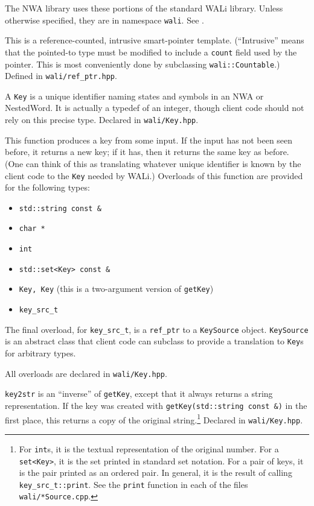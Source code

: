 The NWA library uses these portions of the standard WALi library. Unless
otherwise specified, they are in namespace \texttt{wali}. See \cite{wali}.

\begin{functionlist}
   This is a reference-counted, intrusive
    smart-pointer template. (``Intrusive'' means that the pointed-to type
    must be modified to include a \texttt{count} field used by the
    pointer. This is most conveniently done by subclassing
    \texttt{wali::Countable}.) Defined in \texttt{wali/ref\_ptr.hpp}.

   A \texttt{Key} is a unique identifier naming states and symbols in an
    NWA or NestedWord. It is actually a typedef of an integer, though client
    code should not rely on this precise type. Declared in
    \texttt{wali/Key.hpp}.

   This function produces a key from some input. If
    the input has not been seen before, it returns a new key; if it has, then
    it returns the same key as before. (One can think of this as translating
    whatever unique identifier is known by the client code to the
    \texttt{Key} needed by WALi.) Overloads of this function are provided for
    the following types:
    \begin{itemize}
      \item \texttt{std::string const \&}
      \item \texttt{char *}
      \item \texttt{int}
      \item \texttt{std::set<Key> const \&}
      \item \texttt{Key, Key} (this is a two-argument version of
        \texttt{getKey})
      \item \texttt{key\_src\_t}
    \end{itemize}
    The final overload, for \texttt{key\_src\_t}, is a \texttt{ref\_ptr} to a
    \texttt{KeySource} object. \texttt{KeySource} is an abstract class that
    client code can subclass to provide a translation to \texttt{Key}s for
    arbitrary types.

    All overloads are declared in \texttt{wali/Key.hpp}.

    \texttt{key2str} is an ``inverse'' of \texttt{getKey}, except that it
    always returns a string representation. If the key was created with
    \texttt{getKey(std::string const \&)} in the first place, this
    returns a copy of the original string.\footnote{For \texttt{int}s, it is the
    textual representation of the original number. For a \texttt{set<Key>},
    it is the set printed in standard set notation. For a pair of keys, it is
    the pair printed as an ordered pair. In general, it is the result of
    calling \texttt{key\_src\_t::print}. See the \texttt{print} function in
    each of the files \texttt{wali/*Source.cpp}.} Declared in
    \texttt{wali/Key.hpp}.


\end{functionlist}
